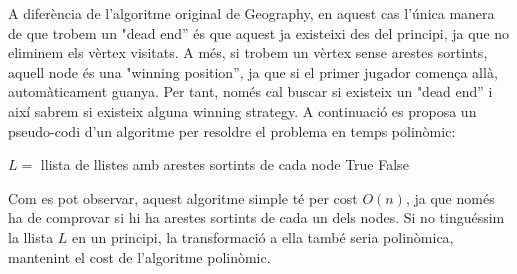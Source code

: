 \documentclass[a4paper]{article}
\begin{document}
A diferència de l’algoritme original de Geography, en aquest cas l'única manera de que trobem un "dead end'' és que aquest ja existeixi des del principi, ja que no eliminem els vèrtex visitats. A més, si  trobem un vèrtex sense arestes sortints, aquell node és una "winning position'', ja que si el primer jugador comença allà, automàticament guanya. Per tant, només cal buscar si existeix un "dead end'' i així sabrem si existeix alguna winning strategy. A continuació es proposa un pseudo-codi d’un algoritme per resoldre el problema en temps polinòmic:

\begin{algorithmic}
	\State $L = $ llista de llistes amb arestes sortints de cada node
			\Return True
		\EndIf
	\EndFor
	\Return False
\end{algorithmic}

Com es pot observar, aquest algoritme simple té per cost $O(n)$, ja que només ha de comprovar si hi ha arestes sortints de cada un dels nodes. Si no tinguéssim la llista $L$ en un principi, la transformació a ella també seria polinòmica, mantenint el cost de l’algoritme polinòmic.
\end{document}
